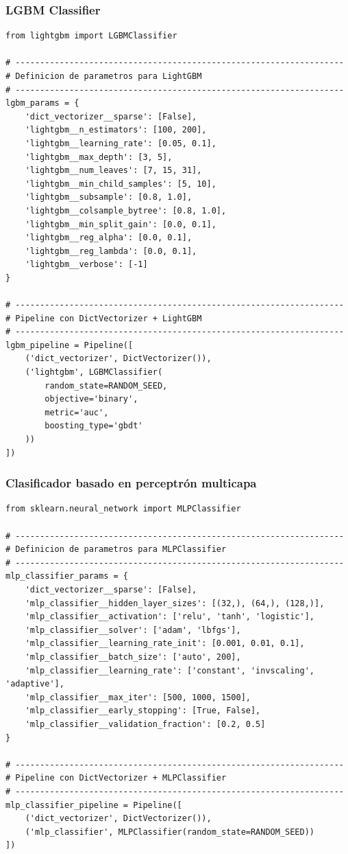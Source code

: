 \documentclass[11pt,a4paper,spanish]{book}
\numberwithin{equation}{chapter}
\numberwithin{figure}{chapter}
\begin{document}
\subsubsection{LGBM Classifier}


\begin{lstlisting}
from lightgbm import LGBMClassifier

# -------------------------------------------------------------------
# Definicion de parametros para LightGBM
# -------------------------------------------------------------------
lgbm_params = {
    'dict_vectorizer__sparse': [False],
    'lightgbm__n_estimators': [100, 200],
    'lightgbm__learning_rate': [0.05, 0.1],  
    'lightgbm__max_depth': [3, 5],  
    'lightgbm__num_leaves': [7, 15, 31],  
    'lightgbm__min_child_samples': [5, 10],  
    'lightgbm__subsample': [0.8, 1.0],
    'lightgbm__colsample_bytree': [0.8, 1.0],
    'lightgbm__min_split_gain': [0.0, 0.1],  
    'lightgbm__reg_alpha': [0.0, 0.1],  
    'lightgbm__reg_lambda': [0.0, 0.1],  
    'lightgbm__verbose': [-1]  
}

# -------------------------------------------------------------------
# Pipeline con DictVectorizer + LightGBM
# -------------------------------------------------------------------
lgbm_pipeline = Pipeline([
    ('dict_vectorizer', DictVectorizer()),
    ('lightgbm', LGBMClassifier(
        random_state=RANDOM_SEED,
        objective='binary',
        metric='auc',
        boosting_type='gbdt'
    ))
])
\end{lstlisting}


\subsubsection{Clasificador basado en perceptrón multicapa}


\begin{lstlisting}
from sklearn.neural_network import MLPClassifier

# -------------------------------------------------------------------
# Definicion de parametros para MLPClassifier
# -------------------------------------------------------------------
mlp_classifier_params = {
    'dict_vectorizer__sparse': [False],
    'mlp_classifier__hidden_layer_sizes': [(32,), (64,), (128,)],
    'mlp_classifier__activation': ['relu', 'tanh', 'logistic'],
    'mlp_classifier__solver': ['adam', 'lbfgs'],
    'mlp_classifier__learning_rate_init': [0.001, 0.01, 0.1],
    'mlp_classifier__batch_size': ['auto', 200],
    'mlp_classifier__learning_rate': ['constant', 'invscaling', 'adaptive'],
    'mlp_classifier__max_iter': [500, 1000, 1500],
    'mlp_classifier__early_stopping': [True, False],
    'mlp_classifier__validation_fraction': [0.2, 0.5]
}

# -------------------------------------------------------------------
# Pipeline con DictVectorizer + MLPClassifier
# -------------------------------------------------------------------
mlp_classifier_pipeline = Pipeline([
    ('dict_vectorizer', DictVectorizer()),
    ('mlp_classifier', MLPClassifier(random_state=RANDOM_SEED))
])
\end{lstlisting}
\end{document}
